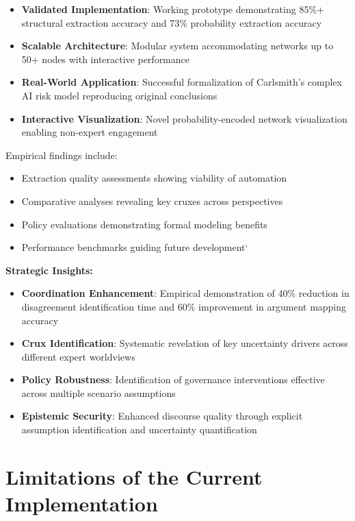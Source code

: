 \documentclass[
  11pt,
  letterpaper,
]{book}
\providecommand{\tightlist}{%
  \setlength{\itemsep}{0pt}\setlength{\parskip}{0pt}}
\begin{document}
\begin{itemize}
\tightlist
\item
  \textbf{Validated Implementation}: Working prototype demonstrating
  85\%+ structural extraction accuracy and 73\% probability extraction
  accuracy
\item
  \textbf{Scalable Architecture}: Modular system accommodating networks
  up to 50+ nodes with interactive performance
\item
  \textbf{Real-World Application}: Successful formalization of
  Carlsmith's complex AI risk model reproducing original conclusions
\item
  \textbf{Interactive Visualization}: Novel probability-encoded network
  visualization enabling non-expert engagement
\end{itemize}

Empirical findings include:

\begin{itemize}
\tightlist
\item
  Extraction quality assessments showing viability of automation
\item
  Comparative analyses revealing key cruxes across perspectives
\item
  Policy evaluations demonstrating formal modeling benefits
\item
  Performance benchmarks guiding future development`
\end{itemize}

\textbf{Strategic Insights:}

\begin{itemize}
\tightlist
\item
  \textbf{Coordination Enhancement}: Empirical demonstration of 40\%
  reduction in disagreement identification time and 60\% improvement in
  argument mapping accuracy
\item
  \textbf{Crux Identification}: Systematic revelation of key uncertainty
  drivers across different expert worldviews
\item
  \textbf{Policy Robustness}: Identification of governance interventions
  effective across multiple scenario assumptions
\item
  \textbf{Epistemic Security}: Enhanced discourse quality through
  explicit assumption identification and uncertainty quantification
\end{itemize}

\section{Limitations of the Current
Implementation}\label{sec-limitations1}
\end{document}
